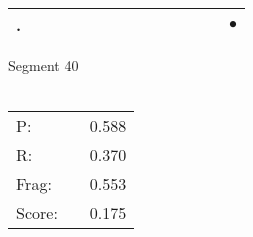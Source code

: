 \documentclass[landscape]{article}
\newcommand{\ssp}{\hspace{2pt}}
\newcommand{\mex}{\cellcolor{g}$\bullet$}
\begin{document}
\begin{tabular}{|l|p{10pt}|p{10pt}|p{10pt}|p{10pt}|p{10pt}|p{10pt}|p{10pt}|p{10pt}|p{10pt}|p{10pt}|p{10pt}|p{10pt}|p{10pt}|}
\hline
\ssp \cellcolor{ref12}. \ssp&\hspace{2pt}&\hspace{2pt}&\hspace{2pt}&\hspace{2pt}&\hspace{2pt}&\hspace{2pt}&\hspace{2pt}&\hspace{2pt}&\hspace{2pt}&\hspace{2pt}&\hspace{2pt}&\hspace{2pt}&\hspace{2pt}\mex\\
\hline
\end{tabular}

\vspace{6pt}
\noindent Segment 40\\\\
\noindent\begin{tabular}{lm{12pt}r}
\hline
P:&&0.588\\
R:&&0.370\\
Frag:&&0.553\\
Score:&&0.175\\
\end{tabular}

\newpage
\end{document}
